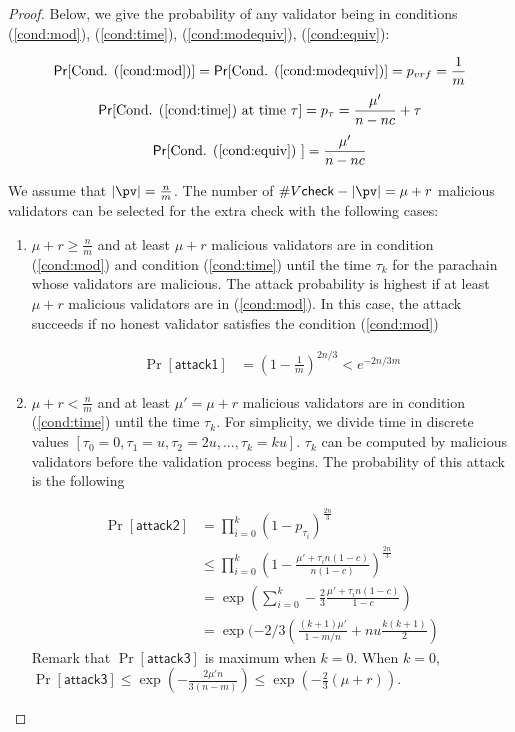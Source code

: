 \begin{proof}

Below, we give the probability of any validator being in conditions (\ref{cond:mod}), (\ref{cond:time}), (\ref{cond:modequiv}), (\ref{cond:equiv}):

$$\Pr[\text{Cond. (\ref{cond:mod})}] = \Pr[\text{Cond. (\ref{cond:modequiv})}] = p_{vrf} = \frac{1}{m}$$
$$\Pr[\text{Cond. (\ref{cond:time}) at time } \tau] = p_\tau =  \frac{\mu'}{n - nc} + \tau $$
$$\Pr[\text{Cond. (\ref{cond:equiv}) }] = \frac{\mu'}{n - nc} $$


We assume that $|\pv| = \frac{n}{m}$.  The number of $\vcheck-|\pv| = \mu + r$ malicious validators can be selected for the extra check with the following cases:

\begin{enumerate}
    
    \item $\mu + r \geq \frac{n}{m}$ and at least $\mu + r$ malicious validators are in condition (\ref{cond:mod}) and condition (\ref{cond:time}) until the time $\tau_k$ for the parachain whose validators are malicious. The attack probability is highest if at least $\mu + r$
    malicious validators are in (\ref{cond:mod}). In this case, the attack succeeds if no honest validator satisfies the condition (\ref{cond:mod}) 
    
    
    \begin{align}\label{eq:attack2}
        \Pr[\mathsf{attack1}] &= (1-\frac{1}{m})^{2n/3} <  e^{-2n/3m} \nonumber
    \end{align}
    
    
    \item $\mu+r < \frac{n}{m}$ and at least $\mu' = \mu+r$ malicious validators are in condition (\ref{cond:time}) until the time $\tau_k$. For simplicity, we divide time in discrete values $[\tau_0 = 0, \tau_1 =u, \tau_2 = 2u, ..., \tau_k = ku]$. $\tau_k$ can be computed by malicious validators before the validation process begins. The probability of this attack is the following
    
    \begin{align}
        \Pr[\mathsf{attack2}] &= \prod_{i = 0}^k(1-p_{\tau_i})^{\frac{2n}{3}} \nonumber\\
        &\leq  \prod_{i = 0}^k (1 - \frac{\mu'+\tau_in(1-c)}{n(1-c)})^{\frac{2n}{3}} \nonumber\\
        &=  \exp(\sum_{i = 0}^k -\frac{2}{3}\frac{\mu' + \tau_in(1-c)}{1-c}) \nonumber\\
        & = \exp(-2/3(\frac{(k+1)\mu'}{1-m/n}+ nu\frac{k(k+1)}{2})\nonumber
    \end{align}
    Remark that $\Pr[\mathsf{attack3}]$ is maximum when $k = 0$. When $k = 0$, $\Pr[\mathsf{attack3}] \leq \exp(-\frac{2\mu' n}{3(n-m)}) \leq \exp(-\frac{2}{3}(\mu + r))$.
    

\end{enumerate}
\end{proof}
